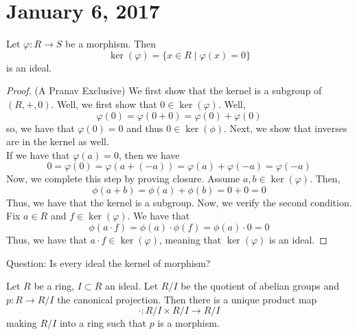 \section{January 6, 2017} %
\begin{fact} \label{Fact 1, Jan 6}
    Let $\varphi: R \rightarrow S$ be a morphism. Then
    $$
    \ker(\varphi) = \{x \in R \mid \varphi(x) = 0\}
    $$
    is an ideal.
\end{fact}
\begin{proof} (A Pranav Exclusive)
    We first show that the kernel is a subgroup of $(R, +, 0)$. Well, we first show that
    $0 \in \ker(\varphi)$. Well,
    $$
    \varphi(0) = \varphi(0 + 0) = \varphi(0) + \varphi(0)
    $$
    so, we have that $\varphi(0) = 0$ and thus $0 \in \ker(\phi)$.
    Next, we show that inverses are in the kernel as well. \\
    If we have that $\varphi(a) = 0$, then we have
    $$0 = \varphi(0) = \varphi(a + (-a)) = \varphi(a) + \varphi(-a) = \varphi(-a)$$
    Now, we complete this step by proving closure. Assume $a,b \in \ker(\varphi)$. Then,
    $$\phi(a + b) = \phi(a) + \phi(b) = 0 + 0 = 0$$
    Thus, we have that the kernel is a subgroup. Now, we verify the second condition.
    Fix $a \in R$ and $f \in \ker(\varphi)$. We have that
    $$
    \phi(a \cdot f) = \phi(a) \cdot \phi(f) = \phi(a) \cdot 0 = 0
    $$
    Thus, we have that $a \cdot f \in \ker(\varphi)$, meaning that $\ker(\varphi)$
    is an ideal.
\end{proof}
\noindent Question: Is every ideal the kernel of morphism?
\begin{prop} \label{Prop 2, Jan 6}
    Let $R$ be a ring, $I \subset R$ an ideal. Let $R / I$ be the quotient of
    abelian groups and $p: R \rightarrow R / I$ the canonical projection. Then there is a
    unique product map
    $$
    \cdot: R/I \times R/I \rightarrow R/I
    $$
    making $R / I$ into a ring such that $p$ is a morphism.
\end{prop}
